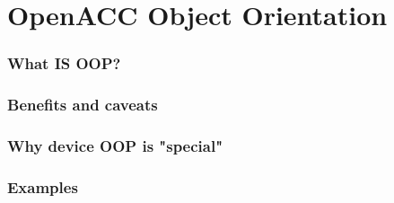 \section{OpenACC Object Orientation}

\begin{frame}
	\frametitle{What IS OOP?}
\end{frame}

\begin{frame}
	\frametitle{Benefits and caveats}
\end{frame}

\begin{frame}
	\frametitle{Why device OOP is "special"}
\end{frame}

\begin{frame}
	\frametitle{Examples}
\end{frame}